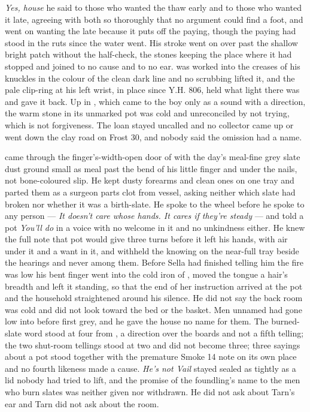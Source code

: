 \emph{Yes, house} he said to those who wanted the thaw early and to those who wanted it late, agreeing with both so thoroughly that no argument could find a foot, and went on wanting the late because it puts off the paying, though the paying had stood in the ruts since the water went. His stroke went on over  past the shallow bright patch without the half-check, the stones keeping the place where it had stopped and joined to no cause and to no ear.  was worked into the creases of his knuckles in the colour of the clean dark line and no scrubbing lifted it, and the pale clip-ring at his left wrist, in place since Y.H. 806, held what light there was and gave it back. Up in , which came to the boy only as a sound with a direction, the warm stone in its unmarked pot was cold and unreconciled by not trying, which is not forgiveness. The loan stayed uncalled and no collector came up or went down the clay road on Frost 30, and nobody said the omission had a name.

 came through the finger's-width-open door of  with the day's meal-fine grey slate dust ground small as meal past the bend of his little finger and under the nails, not bone-coloured slip. He kept dusty forearms and clean ones on one tray and parted them as a surgeon parts clot from vessel, asking neither which slate had broken nor whether it was a birth-slate. He spoke to the wheel before he spoke to any person --- \emph{It doesn't care whose hands. It cares if they're steady} --- and told a pot \emph{You'll do} in a voice with no welcome in it and no unkindness either. He knew the full note that pot would give three turns before it left his hands, with air under it and a want in it, and withheld the knowing on the near-full tray beside the hearings and never among them. Before Sella had finished telling him the fire was low his bent finger went into the cold iron of , moved the tongue a hair's breadth and left it standing, so that the end of her instruction arrived at the pot and the household straightened around his silence. He did not say the back room was cold and did not look toward the bed or the basket. Men unnamed had gone low into  before first grey, and he gave the house no name for them. The burned-slate word stood at four from , a direction over the boards and not a fifth telling; the two shut-room tellings stood at two and did not become three; three sayings about a pot stood together with the premature Smoke 14 note on its own place and no fourth likeness made a cause. \emph{He's not Vail} stayed sealed as tightly as a lid nobody had tried to lift, and the promise of the foundling's name to the men who burn slates was neither given nor withdrawn. He did not ask about Tarn's ear and Tarn did not ask about the room.


